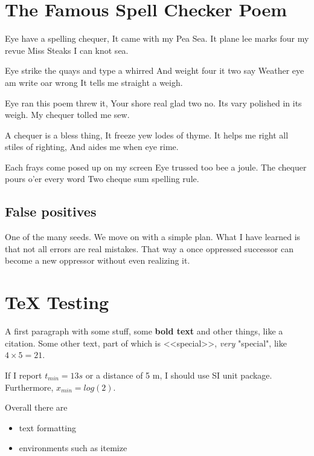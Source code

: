 \documentclass{scrartcl}
\begin{document}



\section{The Famous Spell Checker Poem}
Eye have a spelling chequer,
It came with my Pea Sea.
It plane lee marks four my revue
Miss Steaks I can knot sea.

Eye strike the quays and type a whirred
And weight four it two say
Weather eye am write oar wrong
It tells me straight a weigh.

Eye ran this poem threw it,
Your shore real glad two no.
Its vary polished in its weigh.
My chequer tolled me sew.

A chequer is a bless thing,
It freeze yew lodes of thyme.
It helps me right all stiles of righting,
And aides me when eye rime.

Each frays come posed up on my screen
Eye trussed too bee a joule.
The chequer pours o'er every word
Two cheque sum spelling rule.



\subsection{False positives}
One of the many seeds. We move on with a simple plan.
What I have learned is that not all errors are real mistakes.
That way a once oppressed successor can become a new oppressor without even realizing it.





\section{TeX Testing}\label{sec:texsection}
A first paragraph with some stuff, some \textbf{bold text}   and other things, like a citation\cite{my:paper}.
Some other text, part of which is <<special>>, \emph{very} "special", like $4 \times 5 = 21$.

If I report $t_{min} = 13s$ or a distance of 5 m, I should use SI unit package.
Furthermore, $x_{min} = log(2)$.


Overall there are 
\begin{itemize}
	\item text formatting
	\item environments such as itemize
\end{itemize}
\end{document}
